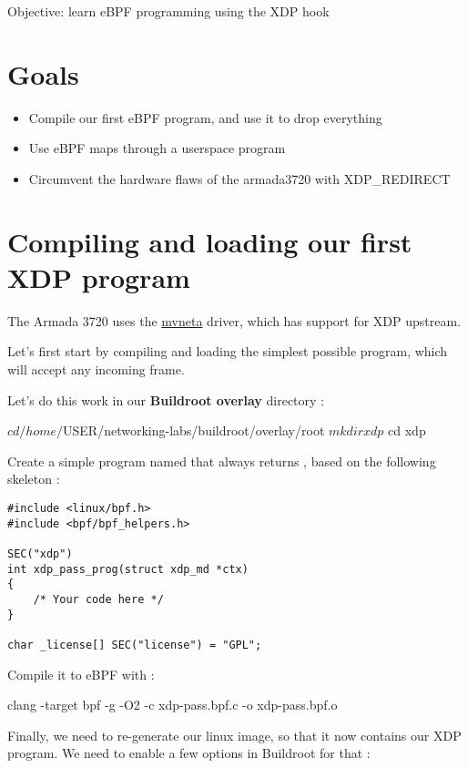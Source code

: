 {Objective: learn eBPF programming using the XDP hook}

\section{Goals}

 \begin{itemize}
 \item Compile our first eBPF program, and use it to drop everything
 \item Use eBPF maps through a userspace program
 \item Circumvent the hardware flaws of the armada3720 with XDP\_REDIRECT
 \end{itemize}

\section{Compiling and loading our first XDP program}

The Armada 3720 uses the \href{tod}{mvneta} driver, which has support for XDP upstream.

Let's first start by compiling and loading the simplest possible program, which
will accept any incoming frame.

Let's do this work in our \textbf{Buildroot overlay} directory :

\begin{hostbashinput}
$ cd /home/$USER/networking-labs/buildroot/overlay/root
$ mkdir xdp
$ cd xdp
\end{hostbashinput}

Create a simple program named  that always returns , based on the following
skeleton :

\begin{verbatim}
#include <linux/bpf.h>
#include <bpf/bpf_helpers.h>

SEC("xdp")
int xdp_pass_prog(struct xdp_md *ctx)
{
	/* Your code here */
}

char _license[] SEC("license") = "GPL";
\end{verbatim}

Compile it to eBPF with  :

\begin{hostbashinput}
clang -target bpf -g -O2 -c xdp-pass.bpf.c -o xdp-pass.bpf.o
\end{hostbashinput}

Finally, we need to re-generate our linux image, so that it now contains our XDP
program. We need to enable a few options in Buildroot for that :

